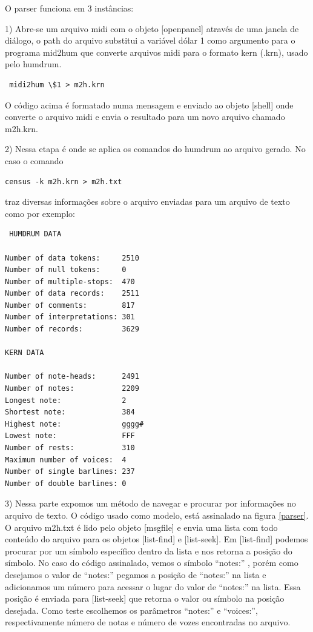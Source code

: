 \documentclass{ppgmus}
\begin{document}
O parser funciona em 3 instâncias:

1) Abre-se um arquivo midi com o objeto [openpanel] através
de uma janela de diálogo, o path do arquivo substitui a variável 
dólar 1 como argumento para o programa mid2hum que converte
arquivos midi para o formato kern (.krn), usado pelo humdrum.
\begin{verbatim}
 midi2hum \$1 > m2h.krn
\end{verbatim} 
  O código acima é formatado numa mensagem e enviado ao objeto
[shell] onde converte o arquivo midi e envia o resultado para
um novo arquivo chamado m2h.krn.
 
2) Nessa etapa é onde se aplica os comandos do humdrum ao 
arquivo gerado. No caso o comando
\begin{verbatim}
census -k m2h.krn > m2h.txt
\end{verbatim} 
traz diversas informações sobre o arquivo enviadas para um 
arquivo de texto como por exemplo:
\begin{verbatim}
 HUMDRUM DATA

Number of data tokens:     2510
Number of null tokens:     0
Number of multiple-stops:  470
Number of data records:    2511
Number of comments:        817
Number of interpretations: 301
Number of records:         3629

KERN DATA

Number of note-heads:      2491
Number of notes:           2209
Longest note:              2
Shortest note:             384
Highest note:              gggg#
Lowest note:               FFF
Number of rests:           310
Maximum number of voices:  4
Number of single barlines: 237
Number of double barlines: 0
\end{verbatim} 

3) Nessa parte expomos um método de navegar e procurar por
informações no arquivo de texto. O código usado como modelo,
está assinalado na figura \ref{parser}. O arquivo m2h.txt
é lido pelo objeto [msgfile] e envia uma lista com todo conteúdo
do arquivo para os objetos [list-find] e [list-seek]. Em [list-find]
podemos procurar por um símbolo específico dentro da lista e nos retorna
a posição do símbolo. No caso do código assinalado, vemos o símbolo 
``notes:'' , porém como desejamos o valor de ``notes:'' pegamos a posição
de ``notes:'' na lista e adicionamos um número para acessar o lugar do valor de
``notes:'' na lista. Essa posição é enviada para [list-seek] que retorna o valor ou
símbolo na posição desejada. Como teste escolhemos os parâmetros ``notes:'' e ``voices:'', 
respectivamente número de notas e número de vozes encontradas no arquivo.
\end{document}
